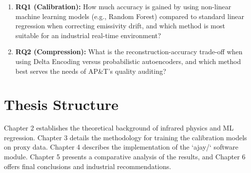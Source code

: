 \begin{enumerate}[leftmargin=2em]
\item \textbf{RQ1 (Calibration):} How much accuracy is gained by using non-linear machine learning models (e.g., Random Forest) compared to standard linear regression when correcting emissivity drift, and which method is most suitable for an industrial real-time environment?
\item \textbf{RQ2 (Compression):} What is the reconstruction-accuracy trade-off when using Delta Encoding versus probabilistic autoencoders, and which method best serves the needs of AP\&T's quality auditing?
\end{enumerate}

\section{Thesis Structure}
\label{sec:thesis_structure}

Chapter 2 establishes the theoretical background of infrared physics and ML regression. Chapter 3 details the methodology for training the calibration models on proxy data. Chapter 4 describes the implementation of the `ajay/` software module. Chapter 5 presents a comparative analysis of the results, and Chapter 6 offers final conclusions and industrial recommendations.


\let\cleardoublepage\clearpage
